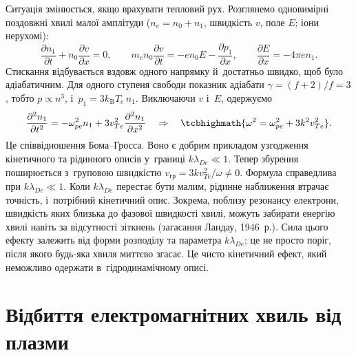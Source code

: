 Ситуація змінюється, якщо врахувати тепловий рух. Розглянемо одновимірні поздовжні хвилі
малої амплітуди ($n_e=n_0+n_1$, швидкість $v$, поле $E$; іони нерухомі):
\begin{equation*}
	\frac{\partial n_1}{\partial t}+n_0\frac{\partial v}{\partial x}=0,\qquad
	m_en_0\frac{\partial v}{\partial t}=-en_0E-\frac{\partial p_1}{\partial x},\qquad
	\frac{\partial E}{\partial x}=-4\pi en_1.
\end{equation*}
Стискання відбувається вздовж одного напрямку й~достатньо швидко, щоб було адіабатичним.
Для одного ступеня свободи показник адіабати $\gamma=(f+2)/f=3$, тобто $p\propto n^3$,
і~$p_1=3k_{\mathrm B}T_e\,n_1$. Виключаючи $v$ і~$E$, одержуємо
\begin{equation*}
	\frac{\partial^2n_1}{\partial t^2}=-\omega_{pe}^2n_1+3v_{Te}^2\frac{\partial^2n_1}{\partial x^2}
	\quad\Rightarrow\quad
	\tcbhighmath{\omega^2=\omega_{pe}^2+3k^2v_{Te}^2}.
\end{equation*}
Це співвідношення Бома--Гросса. Воно є добрим прикладом узгодження кінетичного та
рідинного описів у~границі $k\lambda_{De}\ll1$. Тепер збурення поширюється з~груповою
швидкістю $v_{\mathrm{гр}}=3kv_{Te}^2/\omega\neq0$. Формула справедлива при
$k\lambda_{De}\ll1$. Коли $k\lambda_{De}$ перестає бути малим, рідинне наближення втрачає
точність, і~потрібний кінетичний опис. Зокрема, поблизу резонансу електрони, швидкість
яких близька до фазової швидкості хвилі, можуть забирати енергію хвилі навіть за
відсутності зіткнень (загасання Ландау, 1946~р.). Сила цього ефекту залежить від форми
розподілу та параметра $k\lambda_{De}$; це не просто поріг, після якого будь-яка хвиля
миттєво згасає. Це чисто кінетичний ефект, який неможливо одержати в~гідродинамічному
описі.



\section{Відбиття електромагнітних хвиль від плазми}



